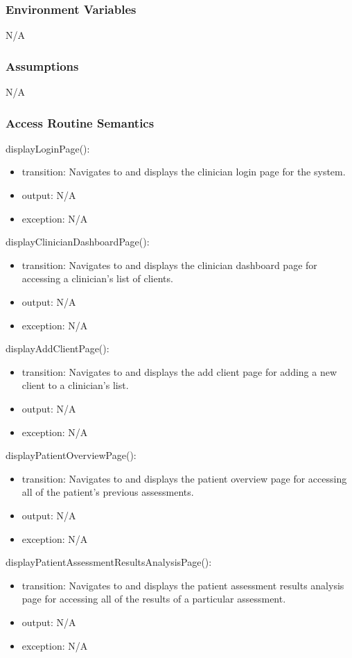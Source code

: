 \documentclass[12pt, titlepage]{article}
\begin{document}
\subsubsection{Environment Variables}
N/A

\subsubsection{Assumptions}
N/A

\subsubsection{Access Routine Semantics}

\noindent displayLoginPage():
\begin{itemize}
\item transition: Navigates to and displays the clinician login page for the system.
\item output: N/A
\item exception: N/A
\end{itemize}

\noindent displayClinicianDashboardPage():
\begin{itemize}
\item transition: Navigates to and displays the clinician dashboard page for accessing a clinician's list of clients.
\item output: N/A
\item exception: N/A
\end{itemize}

\noindent displayAddClientPage():
\begin{itemize}
\item transition: Navigates to and displays the add client page for adding a new client to a clinician's list.
\item output: N/A
\item exception: N/A
\end{itemize}

\noindent displayPatientOverviewPage():
\begin{itemize}
\item transition: Navigates to and displays the patient overview page for accessing all of the patient's previous assessments.
\item output: N/A
\item exception: N/A
\end{itemize}

\noindent displayPatientAssessmentResultsAnalysisPage():
\begin{itemize}
\item transition: Navigates to and displays the patient assessment results analysis page for accessing all of the results of a particular assessment.
\item output: N/A
\item exception: N/A
\end{itemize}
\end{document}

